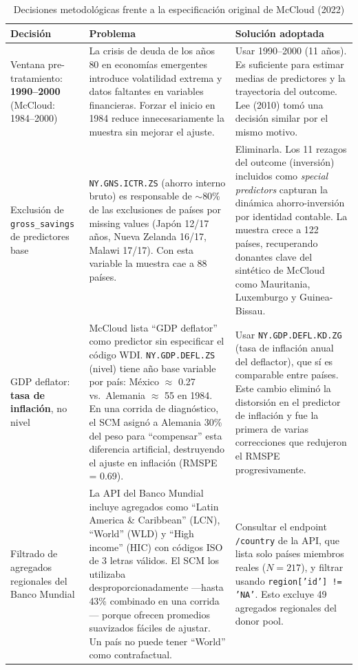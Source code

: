 \documentclass[11pt,a4paper]{article}
\begin{document}
\begin{table}[H]
\centering
\footnotesize
\caption{Decisiones metodológicas frente a la especificación original de McCloud (2022)}
\label{tab:decisiones}
\begin{tabularx}{\textwidth}{@{} p{2.8cm} p{4.2cm} X @{}}
\toprule
\textbf{Decisión} & \textbf{Problema} & \textbf{Solución adoptada} \\
\midrule
Ventana pre-tratamiento: \textbf{1990–2000} (McCloud: 1984–2000)
    & La crisis de deuda de los años 80 en economías emergentes introduce volatilidad extrema y datos faltantes en variables financieras. Forzar el inicio en 1984 reduce innecesariamente la muestra sin mejorar el ajuste.
    & Usar 1990–2000 (11 años). Es suficiente para estimar medias de predictores y la trayectoria del outcome. Lee (2010) tomó una decisión similar por el mismo motivo. \\

Exclusión de \texttt{gross\_savings} de predictores base
    & \texttt{NY.GNS.ICTR.ZS} (ahorro interno bruto) es responsable de $\sim$80\% de las exclusiones de países por missing values (Japón 12/17 años, Nueva Zelanda 16/17, Malawi 17/17). Con esta variable la muestra cae a 88 países.
    & Eliminarla. Los 11 rezagos del outcome (inversión) incluidos como \textit{special predictors} capturan la dinámica ahorro-inversión por identidad contable. La muestra crece a 122 países, recuperando donantes clave del sintético de McCloud como Mauritania, Luxemburgo y Guinea-Bissau. \\

GDP deflator: \textbf{tasa de inflación}, no nivel
    & McCloud lista ``GDP deflator'' como predictor sin especificar el código WDI. \texttt{NY.GDP.DEFL.ZS} (nivel) tiene año base variable por país: México $\approx$ 0.27 vs.\ Alemania $\approx$ 55 en 1984. En una corrida de diagnóstico, el SCM asignó a Alemania 30\% del peso para ``compensar'' esta diferencia artificial, destruyendo el ajuste en inflación (RMSPE = 0.69).
    & Usar \texttt{NY.GDP.DEFL.KD.ZG} (tasa de inflación anual del deflactor), que sí es comparable entre países. Este cambio eliminó la distorsión en el predictor de inflación y fue la primera de varias correcciones que redujeron el RMSPE progresivamente. \\

Filtrado de agregados regionales del Banco Mundial
    & La API del Banco Mundial incluye agregados como ``Latin America \& Caribbean'' (LCN), ``World'' (WLD) y ``High income'' (HIC) con códigos ISO de 3 letras válidos. El SCM los utilizaba desproporcionadamente —hasta 43\% combinado en una corrida— porque ofrecen promedios suavizados fáciles de ajustar. Un país no puede tener ``World'' como contrafactual.
    & Consultar el endpoint \texttt{/country} de la API, que lista solo países miembros reales ($N = 217$), y filtrar usando \texttt{region['id'] != 'NA'}. Esto excluye 49 agregados regionales del donor pool. \\


\end{tabularx}
\end{table}
\end{document}

